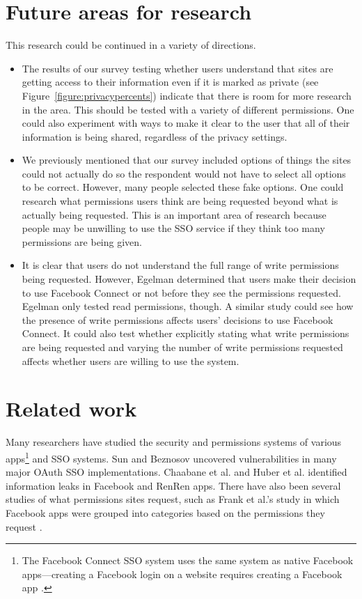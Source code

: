 \documentclass[10pt]{sig-alternate-10pt}
\begin{document}
\section{Future areas for research}

This research could be continued in a variety of directions.

\begin{itemize}
  \item The results of our survey testing whether users understand that sites are getting access to their information even if it is marked as private (see Figure~\ref{figure:privacypercents}) indicate that there is room for more research in the area. This should be tested with a variety of different permissions. One could also experiment with ways to make it clear to the user that all of their information is being shared, regardless of the privacy settings.
  \item We previously mentioned that our survey included options of things the sites could not actually do so the respondent would not have to select all options to be correct. However, many people selected these fake options. One could research what permissions users think are being requested beyond what is actually being requested. This is an important area of research because people may be unwilling to use the SSO service if they think too many permissions are being given.
  \item It is clear that users do not understand the full range of write permissions being requested. However, Egelman \cite{egelman} determined that users make their decision to use Facebook Connect or not before they see the permissions requested. Egelman only tested read permissions, though. A similar study could see how the presence of write permissions affects users' decisions to use Facebook Connect. It could also test whether explicitly stating what write permissions are being requested and varying the number of write permissions requested affects whether users are willing to use the system.
\end{itemize}

\section{Related work}
\label{sec:research}

Many researchers have studied the security and permissions systems of various apps\footnote{The Facebook Connect SSO system uses the same system as native Facebook apps---creating a Facebook login on a website requires creating a Facebook app \cite{fbexample}.} and SSO systems. Sun and Beznosov \cite{devildetails} uncovered vulnerabilities in many major OAuth SSO implementations. Chaabane et al. \cite{chaabane} and Huber et al. \cite{appinspect} identified information leaks in Facebook and RenRen apps. There have also been several studies of what permissions sites request, such as Frank et al.'s study in which Facebook apps were grouped into categories based on the permissions they request \cite{miningpermissions}.
\end{document}
